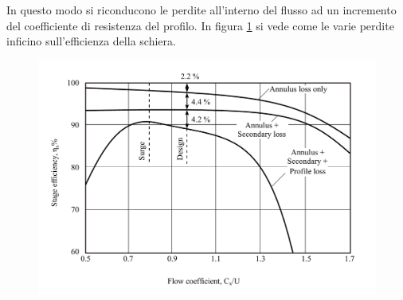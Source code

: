 In questo modo si riconducono le perdite all'interno del flusso ad un incremento del coefficiente di resistenza del profilo. In figura \ref{fig:ComprStageLoss} si vede come le varie perdite inficino sull'efficienza della schiera.
\begin{figure}
\centering
  \includegraphics[width=\textwidth]{fig/ComprStageLoss.pdf}
\caption{}
\label{fig:ComprStageLoss}
\end{figure}
